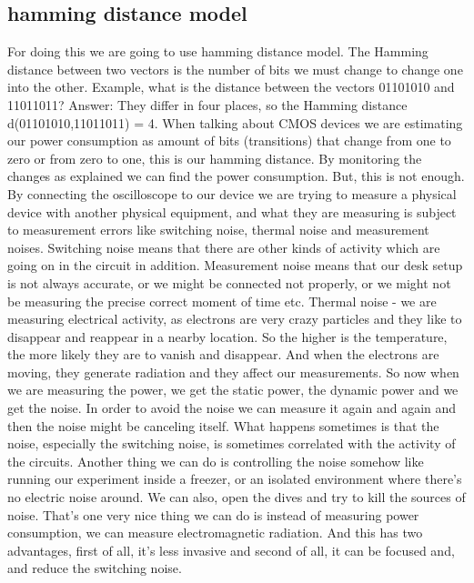 \subsection { hamming distance model }
For doing this we are going to use hamming distance model. The Hamming distance between two vectors is the number of bits we must change to change one into the other. Example, what is the distance between the vectors 01101010 and 11011011? 
Answer: They differ in four places, so the Hamming distance d(01101010,11011011) = 4.
When talking about CMOS devices we are estimating our power consumption as amount of bits (transitions) that change from one to zero or from zero to one, this is our hamming distance. By monitoring the changes as explained we can find the power consumption.
But, this is not enough. By connecting the oscilloscope to our device we are trying to measure a physical device with another physical equipment, and what they are measuring is subject to measurement errors like switching noise, thermal noise and measurement noises.
Switching noise means that there are other kinds of activity which are going on in the circuit in addition. Measurement noise means that our desk setup is not always accurate, or we might be connected not properly, or we might not be measuring the precise correct moment of time etc. Thermal noise - we are measuring electrical activity, as electrons are very crazy particles and they like to disappear and reappear in a nearby location. So the higher is the temperature, the more likely they are to vanish and disappear. And when the electrons are moving, they generate radiation and they affect our measurements.
So now when we are measuring the power, we get the static power, the dynamic power and we get the noise.
In order to avoid the noise we can measure it again and again and then the noise might be canceling itself. What happens sometimes is that the noise, especially the switching noise, is sometimes correlated with the activity of the circuits. Another thing we can do is controlling the noise somehow like running our experiment inside a freezer, or an isolated environment where there's no electric noise around. We can also, open the dives and try to kill the sources of noise.
That's one very nice thing we can do is instead of measuring power consumption, we can measure electromagnetic radiation. And this has two advantages, first of all, it's less invasive and second of all, it can be focused and, and reduce the switching noise.
